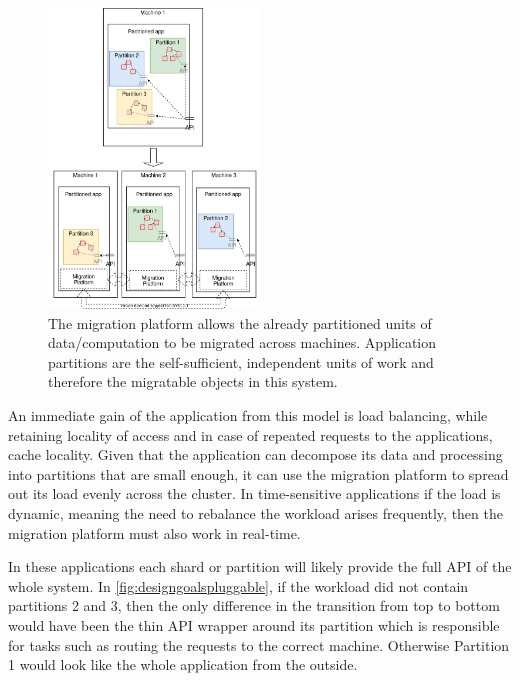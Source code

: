 \begin{figure}[t]
\centering

\includegraphics[width=0.5\textwidth]{design-goals-pluggable.drawio}
\caption{
    The migration platform allows the already partitioned units of
    data/computation to be migrated across machines. Application partitions
    are the self-sufficient, independent units of work and therefore the
    migratable objects in this system.
}
\label{fig:designgoalspluggable}
\end{figure}

An immediate gain of the application from this model is load balancing,
while retaining locality of access and in case of repeated requests to
the applications, cache locality.
Given that the application can decompose its data and processing into
partitions that are small enough, it can use the migration platform to
spread
out its load evenly across the cluster. In time-sensitive applications
if the load is dynamic,
meaning the need to rebalance the workload arises frequently,
then the migration platform must also work in real-time.

In these applications each shard or partition will likely provide the
full API of the whole system. In \autoref{fig:designgoalspluggable},
if the workload did not contain partitions 2 and 3, then the only
    difference in the transition from top to bottom would have been the
    thin API wrapper around its partition which is responsible for tasks
    such as routing the requests to the correct machine. Otherwise
    Partition 1 would look like the whole application from the outside.

